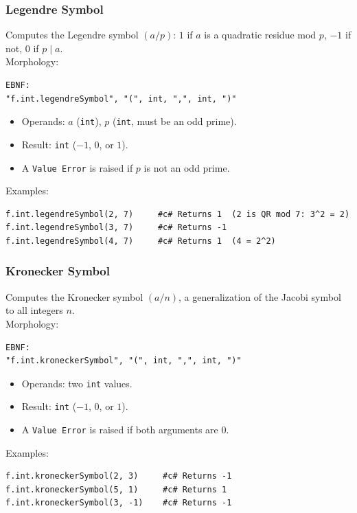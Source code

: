 \subsubsection{Legendre Symbol}
Computes the Legendre symbol $(a/p)$: $1$ if $a$ is a quadratic residue mod $p$, $-1$ if not, $0$ if $p \mid a$. \\
Morphology:
\begin{verbatim}
EBNF:
"f.int.legendreSymbol", "(", int, ",", int, ")"
\end{verbatim}
\begin{itemize}
\item Operands: $a$ (\texttt{int}), $p$ (\texttt{int}, must be an odd prime).
\item Result: \texttt{int} ($-1$, $0$, or $1$).
\item A \texttt{Value Error} is raised if $p$ is not an odd prime.
\end{itemize}
Examples:
\begin{verbatim}
f.int.legendreSymbol(2, 7)     #c# Returns 1  (2 is QR mod 7: 3^2 = 2)
f.int.legendreSymbol(3, 7)     #c# Returns -1
f.int.legendreSymbol(4, 7)     #c# Returns 1  (4 = 2^2)
\end{verbatim}

\subsubsection{Kronecker Symbol}
Computes the Kronecker symbol $(a/n)$, a generalization of the Jacobi symbol to all integers $n$. \\
Morphology:
\begin{verbatim}
EBNF:
"f.int.kroneckerSymbol", "(", int, ",", int, ")"
\end{verbatim}
\begin{itemize}
\item Operands: two \texttt{int} values.
\item Result: \texttt{int} ($-1$, $0$, or $1$).
\item A \texttt{Value Error} is raised if both arguments are $0$.
\end{itemize}
Examples:
\begin{verbatim}
f.int.kroneckerSymbol(2, 3)     #c# Returns -1
f.int.kroneckerSymbol(5, 1)     #c# Returns 1
f.int.kroneckerSymbol(3, -1)    #c# Returns -1
\end{verbatim}

